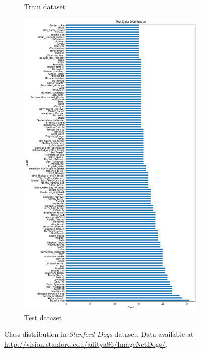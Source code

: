 \begin{figure}[ht]
\begin{subfigure}{.48\textwidth}
    \caption{Train dataset}
\end{subfigure}
 \begin{subfigure}{.48\textwidth}
    \centering
    \includegraphics[width=\textwidth]{appendixes/images/dogs-test.png}
    \caption{Test dataset}
\end{subfigure}

 \caption{Class distribution in \textit{Stanford Dogs}\cite{stanford-dogs} dataset. Data available at \url{http://vision.stanford.edu/aditya86/ImageNetDogs/}.}
\end{figure}

